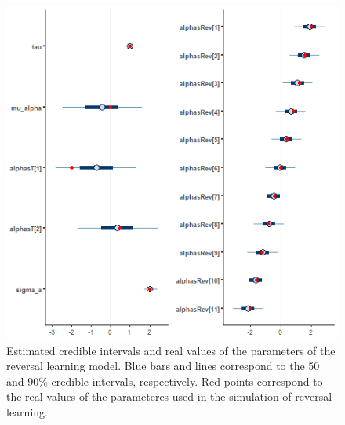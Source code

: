 \documentclass[
]{article}
\begin{document}
\begin{figure}

\includegraphics{sim_mcmc_interv_rev} \hfill{}

\caption{Estimated credible intervals and real values of the parameters of the reversal learning model. Blue bars and lines correspond to the 50 and 90\% credible intervals, respectively. Red points correspond to the real values of the parameteres used in the simulation of reversal learning. }\label{fig:rev_sim_interv_block}
\end{figure}
\end{document}
